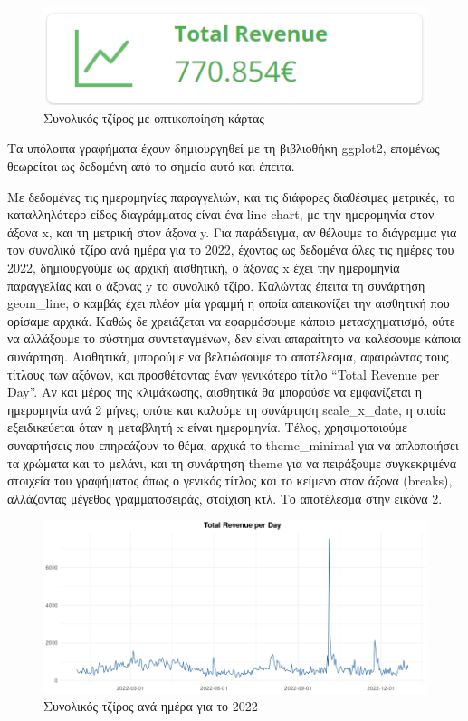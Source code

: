 \documentclass[greek, 12pt]{article}
\begin{document}
\begin{figure}[h]
    \centering
    \includegraphics[width=\textwidth]{pictures/1_card_graph.png}
    \caption{Συνολικός τζίρος με οπτικοποίηση κάρτας}
    \label{fig:1}
\end{figure}

Τα υπόλοιπα γραφήματα έχουν δημιουργηθεί με τη βιβλιοθήκη ggplot2, επομένως θεωρείται ως δεδομένη από το σημείο αυτό και έπειτα. 

Με δεδομένες τις ημερομηνίες παραγγελιών, και τις διάφορες διαθέσιμες μετρικές, το καταλληλότερο είδος διαγράμματος είναι ένα line chart, με την ημερομηνία στον άξονα x, και τη μετρική στον άξονα y. Για παράδειγμα, αν θέλουμε το διάγραμμα για τον συνολικό τζίρο ανά ημέρα για το 2022, έχοντας ως δεδομένα όλες τις ημέρες του 2022, δημιουργούμε ως αρχική αισθητική, ο άξονας x έχει την ημερομηνία παραγγελίας και ο άξονας y το συνολικό τζίρο. Καλώντας έπειτα τη συνάρτηση geom\_line, ο καμβάς έχει πλέον μία γραμμή η οποία απεικονίζει την αισθητική που ορίσαμε αρχικά. Καθώς δε χρειάζεται να εφαρμόσουμε κάποιο μετασχηματισμό, ούτε να αλλάξουμε το σύστημα συντεταγμένων, δεν είναι απαραίτητο να καλέσουμε κάποια συνάρτηση. Αισθητικά, μπορούμε να βελτιώσουμε το αποτέλεσμα, αφαιρώντας τους τίτλους των αξόνων, και προσθέτοντας έναν γενικότερο τίτλο “Total Revenue per Day”. Αν και μέρος της κλιμάκωσης, αισθητικά θα μπορούσε να εμφανίζεται η ημερομηνία ανά 2 μήνες, οπότε και καλούμε τη συνάρτηση scale\_x\_date, η οποία εξειδικεύεται όταν η μεταβλητή x είναι ημερομηνία. Τέλος, χρησιμοποιούμε συναρτήσεις που επηρεάζουν το θέμα, αρχικά το theme\_minimal για να απλοποιήσει τα χρώματα και το μελάνι, και τη συνάρτηση theme για να πειράξουμε συγκεκριμένα στοιχεία του γραφήματος όπως ο γενικός τίτλος και το κείμενο στον άξονα (breaks), αλλάζοντας μέγεθος γραμματοσειράς, στοίχιση κτλ. Το αποτέλεσμα στην εικόνα \ref{fig:2}.

\begin{figure}[h]
    \centering
    \includegraphics[width=\textwidth]{pictures/2_timeline_graph.png}
    \caption{Συνολικός τζίρος ανά ημέρα για το 2022}
    \label{fig:2}
\end{figure}
\end{document}
